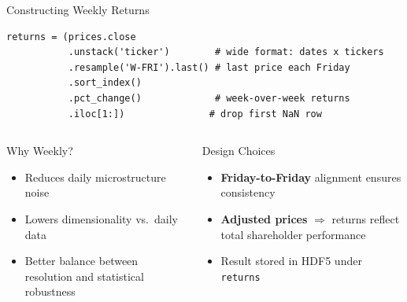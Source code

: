 \documentclass[aspectratio=169]{beamer}
\begin{document}
\begin{frame}[fragile]{Constructing Weekly Returns}

\begin{lstlisting}
returns = (prices.close
           .unstack('ticker')        # wide format: dates x tickers
           .resample('W-FRI').last() # last price each Friday
           .sort_index()
           .pct_change()             # week-over-week returns
           .iloc[1:])               # drop first NaN row
\end{lstlisting}

\vspace{0.3cm}

\begin{columns}[T]
\begin{block}{Why Weekly?}
\begin{itemize}
  \item Reduces daily microstructure noise
  \item Lowers dimensionality vs.\ daily data
  \item Better balance between resolution and statistical robustness
\end{itemize}
\end{block}

\begin{block}{Design Choices}
\begin{itemize}
  \item \textbf{Friday-to-Friday} alignment ensures consistency
  \item \textbf{Adjusted prices} $\Rightarrow$ returns reflect total shareholder performance
  \item Result stored in HDF5 under \texttt{returns}
\end{itemize}
\end{block}
\end{columns}

\end{frame}
%
\end{document}
